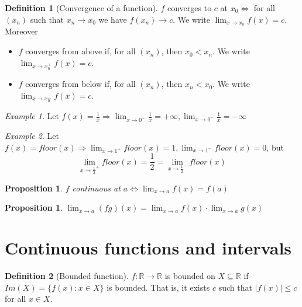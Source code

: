 \documentclass{article}
\newcommand{\DS}{\displaystyle}
\newcommand{\abs}[1]{\left|#1\right|}
\newcommand{\Ar}{\Rightarrow}
\newcommand{\fr}[2]{\frac{#1}{#2}}
\newcommand{\fOnR}[1]{#1 : \mathbb{R} \rightarrow \mathbb{R}}
\newcommand{\limx}[1]{\lim_{x \to #1}}
\theoremstyle{definition}
\newtheorem{definition}{Definition}[section]
\theoremstyle{definition}
\theoremstyle{plain}
\theoremstyle{plain}
\theoremstyle{plain}
\theoremstyle{plain}
\newtheorem{proposition}[theorem]{Proposition}
\theoremstyle{definition}
\theoremstyle{remark}
\newtheorem{exampled}{Example}[definition]
\theoremstyle{remark}
\theoremstyle{remark}
\theoremstyle{remark}
\newcommand{\R}{\mathbb{R}}
\begin{document}
\begin{definition}[Convergence of a function]
  $f$ converges to $c$ at $x_0 \iff$ for all $(x_n)$ such that $x_n \to x_0$ we have $f(x_n) \to c$. We write $\DS \limx{x_0} f(x) = c$. Moreover
  \begin{itemize}
    \item $f$ converges from above if, for all $(x_n)$, then $x_0 < x_n$.
    We write $\DS \limx{x_0^+} f(x) = c$.
    \item $f$ converges from below if, for all $(x_n)$, then $x_n < x_0$.
    We write $\DS \limx{x_0^-} f(x) = c$.
  \end{itemize}
\end{definition}

\begin{exampled}
  Let $\DS f(x) = \fr{1}{x} \Ar \limx{0^+} \fr{1}{x} = +\infty, \limx{0^-} \fr{1}{x} = -\infty$
\end{exampled}

\begin{exampled}
  Let $\DS f(x) = floor(x) \Ar \limx{1^+} floor(x) = 1, \limx{1^-} floor(x) = 0$, but
  \[
  \DS \limx{\fr{1}{2}^+} floor(x) = \fr{1}{2} = \limx{\fr{1}{2}^-} floor(x)
  \]
\end{exampled}


\begin{proposition}
  $f$ continuous at $\DS a \iff \limx{a} f(x) = f(a)$
\end{proposition}


\begin{proposition}
  $\DS \limx{a} (fg)(x) = \limx{a} f(x) \cdot \limx{a} g(x)$
\end{proposition}


\newpage
\section{Continuous functions and intervals}


\begin{definition}[Bounded function]
  $\fOnR{f}$ is bounded on $X \subseteq \R$ if $Im(X) = \{ f(x) : x \in X \}$ is bounded. That is, it exists $c$ such that $\abs{f(x)} \leq c$ for all $x \in X$.
\end{definition}
\end{document}
